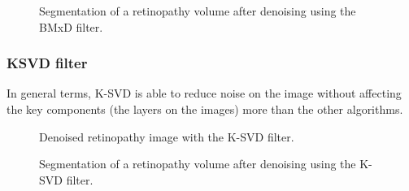 \begin{figure}[H]
  \centering
  \caption{Segmentation of a retinopathy volume after denoising using the BMxD filter.} 
  \label{fig:results_rsegmentation_bmxd}
\end{figure}



\subsubsection{KSVD filter}
 In general terms, K-SVD is able to reduce noise on the image without affecting the key components (the layers on the images) more than the other algorithms.
 
\begin{figure}[H]
  \centering
  \caption{Denoised retinopathy image with the K-SVD filter.} 
  \label{fig:results_rimage_ksvd}
\end{figure}

\begin{figure}[H]
  \centering
  \caption{Segmentation of a retinopathy volume after denoising using the K-SVD filter.} 
  \label{fig:results_rsegmentation_ksvd}
\end{figure}




